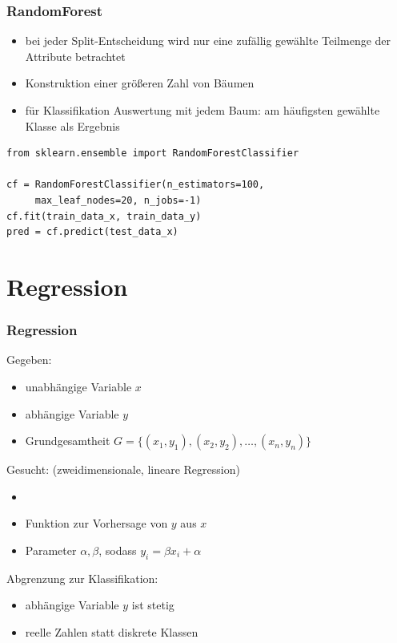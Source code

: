 \begin{frame}[fragile]
  \frametitle{RandomForest}

    \begin{itemize}
      \item bei jeder Split-Entscheidung wird nur eine zufällig gewählte Teilmenge der Attribute betrachtet
      \item Konstruktion einer größeren Zahl von Bäumen
      \item für Klassifikation Auswertung mit jedem Baum: am häufigsten gewählte Klasse als Ergebnis
  \end{itemize}

  \begin{verbatim}
from sklearn.ensemble import RandomForestClassifier

cf = RandomForestClassifier(n_estimators=100,
     max_leaf_nodes=20, n_jobs=-1)
cf.fit(train_data_x, train_data_y)
pred = cf.predict(test_data_x)
\end{verbatim}
\end{frame}



\section{Regression}



\begin{frame}
\frametitle{Regression}

Gegeben:
\begin{itemize}
	\item unabhängige Variable $x$
	\item abhängige Variable $y$
	\item Grundgesamtheit $G = \{(x_1, y_1), (x_2, y_2), \dots, (x_n, y_n)\}$
\end{itemize}

Gesucht: {\scriptsize (zweidimensionale, lineare Regression)}
\begin{itemize}
	\item {}
	\item Funktion zur Vorhersage von $y$ aus $x$
	\item Parameter $\alpha, \beta$, sodass $y_i = \beta x_i + \alpha$
\end{itemize}

Abgrenzung zur Klassifikation:
\begin{itemize}
	\item abhängige Variable $y$ ist stetig
	\item reelle Zahlen statt diskrete Klassen
\end{itemize}

\end{frame}

